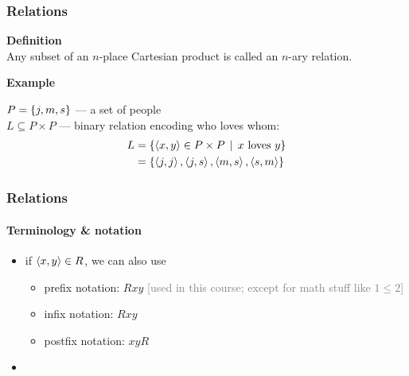 \documentclass[fleqn,10pt,serif,xcolor=svgnames,xcolor=table,aspectratio=169,handout]{beamer}
\newcommand{\mygray}[1]{\textcolor{gray}{#1}}
\begin{document}
\begin{frame}
  \frametitle{Relations}

  \textbf{{\color{themecolor}Definition}}\\
  Any subset of an $n$-place Cartesian product is called an $n$-ary relation.

  \bigskip

  \textbf{{\color{themecolor}Example}}\\
  \begin{minipage}{0.65\linewidth}
    $P = \left\{j,m,s\right\}$ --- a set of people\\
    $L \subseteq P \times P$ --- binary relation encoding who loves whom:
    \begin{align*}
      L & = \left\{\left \langle x,y\right\rangle \in P \times P \thinspace \mid \thinspace \text{$x$ loves $y$}\right\} \\
        & = \left\{\left \langle j,j\right\rangle, \left \langle j,s\right\rangle, \left \langle m,s\right\rangle, \left \langle s,m\right\rangle\right\}
    \end{align*}
  \end{minipage}
  \hfill
  \begin{minipage}{0.3\linewidth}
    \begin{center}
    \end{center}
  \end{minipage}

\end{frame}

\begin{frame}
  \frametitle{Relations}
  \framesubtitle{Terminology \& notation}

  \begin{itemize}
    \item if $\left \langle x,y\right\rangle \in R$, we can also use
    \begin{itemize}
      \item \textcolor{themecolor}{prefix notation:} $Rxy$ \hfill \mygray{[used in this course; except for math stuff like $1\le2$]}
      \item \textcolor{themecolor}{infix notation:} $Rxy$
      \item \textcolor{themecolor}{postfix notation:} $xyR$
    \end{itemize}
    \item
  \end{itemize}

\end{frame}
\end{document}
